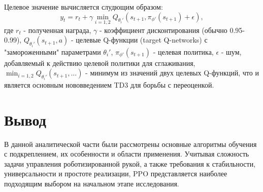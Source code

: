 Целевое значение вычисляется слудющим образом:
\begin{equation}
    y_t = r_t + \gamma \min_{i=1,2} Q_{\theta_i'}(s_{t+1}, \pi_{\phi'}(s_{t+1}) + \epsilon),
\end{equation}
где
$r_t$ - полученная награда,
$\gamma$ - коэффициент дисконтирования (обычно 0.95-0.99),
$Q_{\theta_i'}(s_{t+1}, a)$ - целевые Q-функции (target Q-networks) с "замороженными" параметрами $\theta_i'$,
$\pi_{\phi'}(s_{t+1})$ - целевая политика,
$\epsilon$ - шум, добавляемый к действию целевой политики для сглаживания,
$\min_{i=1,2} Q_{\theta_i'}(s_{t+1}, ...)$ - минимум из значений двух целевых Q-функций, что и является основным нововведением TD3 для борьбы с переоценкой.

\section*{Вывод}
В данной аналитической части были рассмотрены основные алгоритмы обучения с подкреплением, их особенности и области применения. 
Учитывая сложность задачи управления роботизированной рукой, а также требования к стабильности, 
универсальности и простоте реализации, PPO представляется наиболее подходящим выбором на начальном этапе исследования. 

\clearpage

